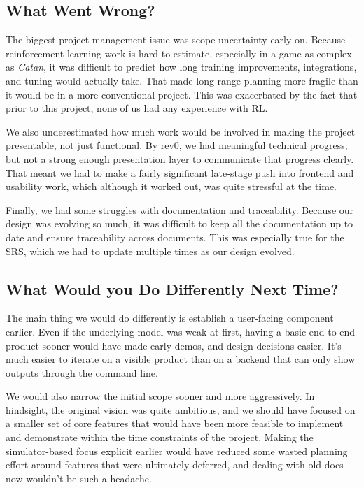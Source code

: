 \documentclass{article}
\begin{document}
\subsection{What Went Wrong?}


The biggest project-management issue was scope uncertainty early on.
Because reinforcement learning work is hard to estimate, especially in a game as complex as \emph{Catan},
it was difficult to predict how long training improvements, integrations, and tuning would actually take.
That made long-range planning more fragile than it would be in a more conventional project.
This was exacerbated by the fact that prior to this project, none of us had any experience with RL.

We also underestimated how much work would be involved in making the project presentable, not just functional.
By rev0, we had meaningful technical progress, but not a strong enough presentation layer to communicate that
progress clearly.
That meant we had to make a fairly significant late-stage push into frontend and usability work, which although
it worked out, was quite stressful at the time.

Finally, we had some struggles with documentation and traceability.
Because our design was evolving so much, it was difficult to keep all the documentation up to date and ensure
traceability across documents.
This was especially true for the SRS, which we had to update multiple times as our design evolved.

\subsection{What Would you Do Differently Next Time?}


The main thing we would do differently is establish a user-facing component earlier.
Even if the underlying model was weak at first, having a basic end-to-end product sooner would have made early
demos, and design decisions easier.
It's much easier to iterate on a visible product than on a backend that can only show outputs through the
command line.

We would also narrow the initial scope sooner and more aggressively.
In hindsight, the original vision was quite ambitious, and we should have focused on a smaller set of
core features that would have been more feasible to implement and demonstrate within the time constraints
of the project.
Making the simulator-based focus explicit earlier would have reduced some wasted planning effort
around features that were ultimately deferred, and dealing with old docs now wouldn't be such a headache.
\end{document}
